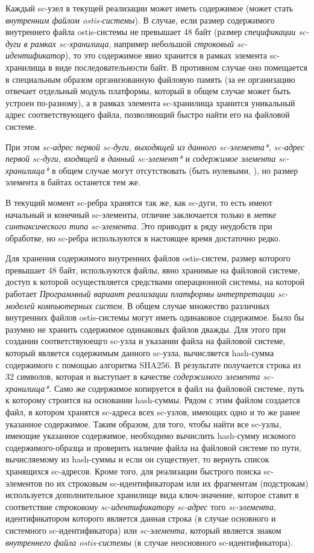 Каждый sc-узел в текущей реализации может иметь содержимое (может стать \textit{внутренним файлом ostis-системы}).
В случае, если размер содержимого внутреннего файла ostis-системы не превышает 48 байт (размер \textit{спецификации
sc-дуги в рамках sc-хранилища}, например небольшой \textit{строковый \mbox{sc-идентификатор}}), то это содержимое явно
хранится в рамках элемента \mbox{sc-хранилища} в виде последовательности байт. В противном случае оно помещается в
специальным образом организованную файловую память (за ее организацию отвечает отдельный модуль платформы, который в
общем случае может быть устроен по-разному), а в рамках элемента sc-хранилища хранится уникальный адрес соответствующего
файла, позволяющий быстро найти его на файловой системе.

При этом \textit{sc-адрес первой sc-дуги, выходящей из данного sc-элемента*}, \textit{sc-адрес первой sc-дуги, входящей
в данный sc-элемент*} и \textit{содержимое элемента sc-хранилища*} в общем случае могут отсутствовать (быть нулевыми,
), но размер элемента в байтах останется тем же.

В текущий момент sc-ребра хранятся так же, как sc-дуги, то есть имеют начальный и конечный sc-элементы, отличие
заключается только в \textit{метке синтаксического типа sc-элемента}. Это приводит к ряду неудобств при обработке,
но sc-ребра используются в настоящее время достаточно редко.

Для хранения содержимого внутренних файлов ostis-систем, размер которого превышает 48 байт, используются файлы, явно
хранимые на файловой системе, доступ к которой осуществляется средствами операционной системы, на которой работает
\textit{Программный вариант реализации платформы интерпретации sc-моделей компьютерных систем}. В общем случае множество
различных внутренних файлов ostis-системы могут иметь одинаковое содержимое. Было бы разумно не хранить содержимое
одинаковых файлов дважды. Для этого при создании соответствуюещго sc-узла и указании файла на файловой системе, который
является содержимым данного sc-узла, вычисляется hash-сумма содержимого с помощью алгоритма SHA256. В результате получается
строка из 32 символов, которая и выступает в качестве \textit{содержимого элемента sc-хранилища*}. Само же содержимое
копируется в файл на файловой системе, путь к которому строится на основании hash-суммы. Рядом с этим файлом
создается файл, в котором хранятся sc-адреса всех sc-узлов, имеющих одно и то же ранее указанное содержимое.
Таким образом, для того, чтобы найти все sc-узлы, имеющие указанное содержимое, необходимо вычислить hash-сумму
искомого содержимого-образца и проверить наличие файла на файловой системе по пути, вычисляемому из hash-суммы и если
он существует, то вернуть список хранящихся sc-адресов. Кроме того, для реализации быстрого поиска
sc-элементов по их строковым sc-идентификаторам или их фрагментам (подстрокам) используется дополнительное
хранилище вида ключ-значение, которое ставит в соответствие \textit{строковому sc-идентификатору} \textit{sc-адрес}
того \textit{sc-элемента}, идентификатором которого является данная строка (в случае основного и системного sc-идентификатора)
или \textit{sc-элемента}, который является знаком \textit{внутреннего файла ostis-системы} (в случае неосновного
sc-идентификатора).


